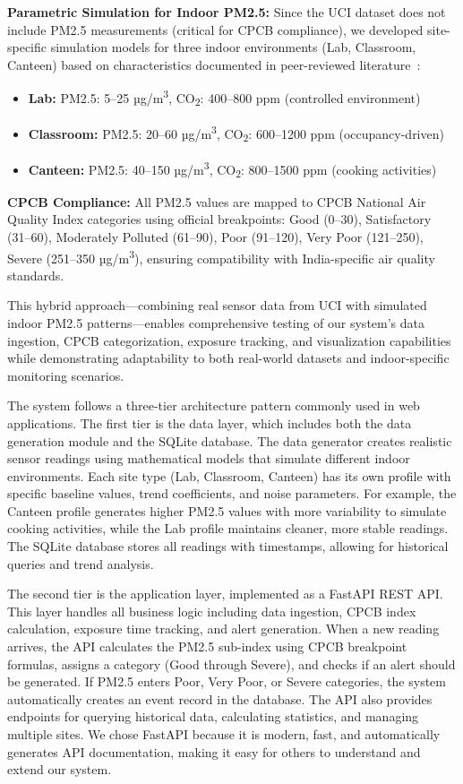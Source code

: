 \documentclass[12pt]{report}
\begin{document}
\textbf{Parametric Simulation for Indoor PM2.5:} Since the UCI dataset does not include PM2.5 measurements (critical for CPCB compliance), we developed site-specific simulation models for three indoor environments (Lab, Classroom, Canteen) based on characteristics documented in peer-reviewed literature~\cite{marques2016,mumtaz2021,saini2020}:
\begin{itemize}
  \item \textbf{Lab:} PM2.5: 5--25 µg/m\textsuperscript{3}, CO\textsubscript{2}: 400--800 ppm (controlled environment)
  \item \textbf{Classroom:} PM2.5: 20--60 µg/m\textsuperscript{3}, CO\textsubscript{2}: 600--1200 ppm (occupancy-driven)
  \item \textbf{Canteen:} PM2.5: 40--150 µg/m\textsuperscript{3}, CO\textsubscript{2}: 800--1500 ppm (cooking activities)
\end{itemize}

\textbf{CPCB Compliance:} All PM2.5 values are mapped to CPCB National Air Quality Index categories using official breakpoints: Good (0--30), Satisfactory (31--60), Moderately Polluted (61--90), Poor (91--120), Very Poor (121--250), Severe (251--350 µg/m\textsuperscript{3}), ensuring compatibility with India-specific air quality standards.

This hybrid approach—combining real sensor data from UCI with simulated indoor PM2.5 patterns—enables comprehensive testing of our system's data ingestion, CPCB categorization, exposure tracking, and visualization capabilities while demonstrating adaptability to both real-world datasets and indoor-specific monitoring scenarios.

The system follows a three-tier architecture pattern commonly used in web applications. The first tier is the data layer, which includes both the data generation module and the SQLite database. The data generator creates realistic sensor readings using mathematical models that simulate different indoor environments. Each site type (Lab, Classroom, Canteen) has its own profile with specific baseline values, trend coefficients, and noise parameters. For example, the Canteen profile generates higher PM2.5 values with more variability to simulate cooking activities, while the Lab profile maintains cleaner, more stable readings. The SQLite database stores all readings with timestamps, allowing for historical queries and trend analysis.

The second tier is the application layer, implemented as a FastAPI REST API. This layer handles all business logic including data ingestion, CPCB index calculation, exposure time tracking, and alert generation. When a new reading arrives, the API calculates the PM2.5 sub-index using CPCB breakpoint formulas, assigns a category (Good through Severe), and checks if an alert should be generated. If PM2.5 enters Poor, Very Poor, or Severe categories, the system automatically creates an event record in the database. The API also provides endpoints for querying historical data, calculating statistics, and managing multiple sites. We chose FastAPI because it is modern, fast, and automatically generates API documentation, making it easy for others to understand and extend our system.
\end{document}
